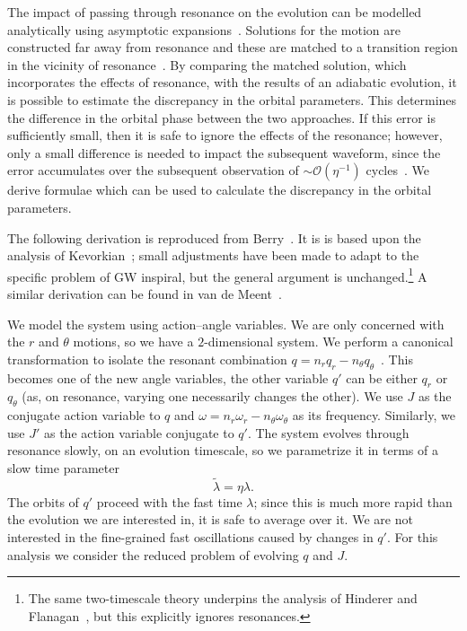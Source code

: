 \documentclass[aps,prd,amsfonts,amssymb,amsmath,nofootinbib,showpacs,superscriptaddress,twocolumn,floatfix]{revtex4-1}
\newcommand{\order}[1]{\ensuremath{\mathcal{O}({#1})}}
\begin{document}
The impact of passing through resonance on the evolution can be modelled analytically using asymptotic expansions~\cite{Gair2012}. Solutions for the motion are constructed far away from resonance and these are matched to a transition region in the vicinity of resonance~\cite{Kevorkian1971,Bosley1992}. By comparing the matched solution, which incorporates the effects of resonance, with the results of an adiabatic evolution, it is possible to estimate the discrepancy in the orbital parameters. This determines the difference in the orbital phase between the two approaches. If this error is sufficiently small, then it is safe to ignore the effects of the resonance; however, only a small difference is needed to impact the subsequent waveform, since the error accumulates over the subsequent observation of $\sim \order{\eta^{-1}}$ cycles~\cite{Flanagan2012}. We derive formulae which can be used to calculate the discrepancy in the orbital parameters.

The following derivation is reproduced from Berry~\cite{BerryThesis2013}. It is is based upon the analysis of Kevorkian~\cite{Kevorkian1987}; small adjustments have been made to adapt to the specific problem of GW inspiral, but the general argument is unchanged.\footnote{The same two-timescale theory underpins the analysis of Hinderer and Flanagan~\cite{Hinderer2008}, but this explicitly ignores resonances.} A similar derivation can be found in van de Meent~\cite{VanDeMeent2013}.

We model the system using action--angle variables. We are only concerned with the $r$ and $\theta$ motions, so we have a $2$-dimensional system. We perform a canonical transformation  to isolate the resonant combination $q = n_r q_r - n_\theta q_\theta$~\cite{Bosley1992,VanDeMeent2013}. This becomes one of the new angle variables, the other variable $q'$ can be either $q_r$ or $q_\theta$ (as, on resonance, varying one necessarily changes the other). We use $J$ as the conjugate action variable to $q$ and $\omega = n_r \omega_r - n_\theta \omega_\theta$ as its frequency. Similarly, we use $J'$ as the action variable conjugate to $q'$. The system evolves through resonance slowly, on an evolution timescale, so we parametrize it in terms of a slow time parameter
\begin{equation}
\widetilde{\lambda} = \eta\lambda.
\end{equation}
The orbits of $q'$ proceed with the fast time $\lambda$; since this is much more rapid than the evolution we are interested in, it is safe to average over it. We are not interested in the fine-grained fast oscillations caused by changes in $q'$. For this analysis we consider the reduced problem of evolving $q$ and $J$.
\end{document}
